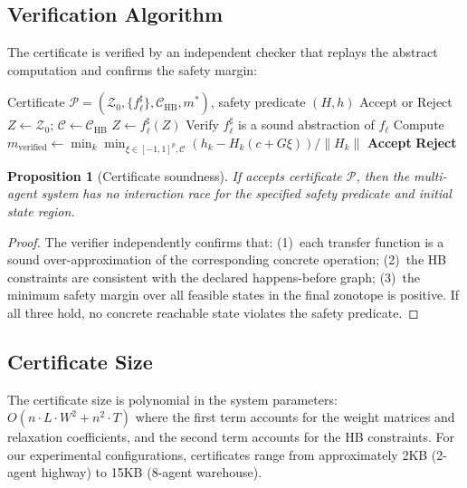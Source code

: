 \documentclass[11pt]{article}
\newtheorem{proposition}[theorem]{Proposition}
\newcommand{\calZ}{\mathcal{Z}}
\newcommand{\calP}{\mathcal{P}}
\newcommand{\calC}{\mathcal{C}}
\newcommand{\norm}[1]{\lVert #1 \rVert}
\begin{document}
\subsection{Verification Algorithm}

The certificate is verified by an independent checker that replays the
abstract computation and confirms the safety margin:

\begin{algorithm}[H]
\caption{Certificate Verification}
\label{alg:verify}
\begin{algorithmic}[1]
\Require Certificate $\calP = (\calZ_0, \{f^\sharp_\ell\}, \calC_{\text{HB}}, m^*)$,
safety predicate $(H, h)$
\Ensure Accept or Reject
\State $Z \leftarrow \calZ_0$; $\calC \leftarrow \calC_{\text{HB}}$
  \State $Z \leftarrow f^\sharp_\ell(Z)$ 
  \State Verify $f^\sharp_\ell$ is a sound abstraction of $f_\ell$
\EndFor
\State Compute $m_{\text{verified}} \leftarrow \min_k \min_{\xi \in [-1,1]^p, \calC}
  (h_k - H_k(c + G\xi)) / \norm{H_k}$
  \State \Return \textbf{Accept}
\Else
  \State \Return \textbf{Reject}
\EndIf
\end{algorithmic}
\end{algorithm}

\begin{proposition}[Certificate soundness]
If  accepts certificate $\calP$, then the multi-agent
system has no interaction race for the specified safety predicate and
initial state region.
\end{proposition}

\begin{proof}
The verifier independently confirms that:
(1)~each transfer function is a sound over-approximation of the
corresponding concrete operation;
(2)~the HB constraints are consistent with the declared
happens-before graph;
(3)~the minimum safety margin over all feasible states in the
final zonotope is positive.
If all three hold, no concrete reachable state violates the
safety predicate.
\end{proof}

\subsection{Certificate Size}

The certificate size is polynomial in the system parameters:
$O(n \cdot L \cdot W^2 + n^2 \cdot T)$ where the first term accounts
for the weight matrices and relaxation coefficients, and the second term
accounts for the HB constraints. For our experimental configurations,
certificates range from approximately 2KB (2-agent highway) to 15KB
(8-agent warehouse).
\end{document}
